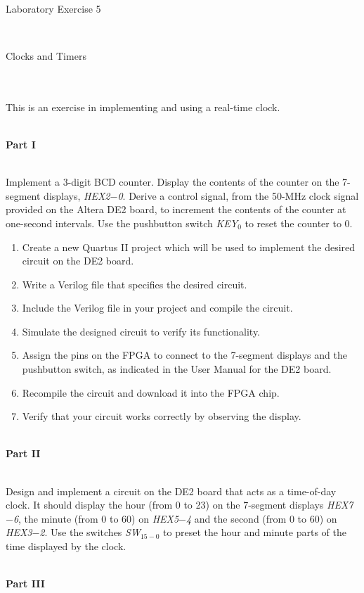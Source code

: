 \documentclass[psfig,10pt,fullpage]{article}
\begin{document}
~\\
~\\
~\\
\centerline{\huge Laboratory Exercise 5}
~\\
\centerline{\large Clocks and Timers}
~\\
~\\

This is an exercise in implementing and using a real-time clock.

~\\
\noindent
{\bf Part I}

~\\
\noindent
Implement a 3-digit BCD counter. Display the contents of the counter 
on the 7-segment displays, {\it HEX2$-$0}. Derive a control signal,
from the 50-MHz clock signal provided on the Altera DE2 board, 
to increment the contents of the counter at one-second intervals. 
Use the pushbutton switch {\it KEY}$_0$ to reset the counter to 0.
\begin{enumerate}
\item Create a new Quartus II project which will be used to implement the desired
circuit on the DE2 board.
\item Write a Verilog file that specifies the desired circuit.
\item Include the Verilog file in your project and compile the circuit.
\item Simulate the designed circuit to verify its functionality.
\item Assign the pins on the FPGA to connect to the 7-segment
displays and the pushbutton switch, 
as indicated in the User Manual for the DE2 board.
\item Recompile the circuit and download it into the FPGA chip.
\item Verify that your circuit works correctly by observing the display.
\end{enumerate}

~\\
\noindent
{\bf Part II}

~\\
\noindent
Design and implement a circuit on the DE2 board that acts as a time-of-day clock.
It should display the hour (from 0 to 23) on the 7-segment displays 
{\it HEX7$-$6}, the minute (from 0 to 60) on {\it HEX5$-$4} and the second (from 0 to 60)
on {\it HEX3$-$2}. Use the switches {\it SW}$_{15-0}$ to preset the hour and minute 
parts of the time displayed by the clock.


~\\
\noindent
{\bf Part III}
\end{document}
